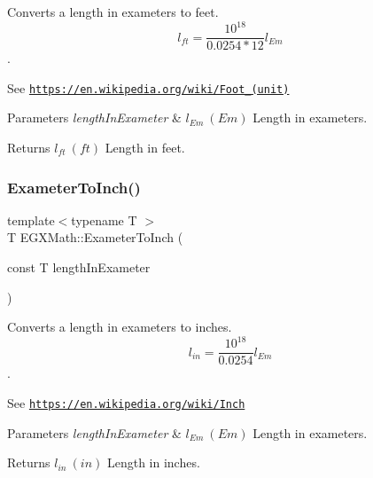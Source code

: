 Converts a length in exameters to feet. \[ l_{ft}= \frac{10^{18}}{0.0254 * 12} l_{Em} \]. 

See \href{https://en.wikipedia.org/wiki/Foot_(unit)}{\tt https\+://en.\+wikipedia.\+org/wiki/\+Foot\+\_\+(unit)} 
\begin{DoxyParams}{Parameters}
{\em length\+In\+Exameter} & $ l_{Em}\ (Em)$ Length in exameters. \\
\hline
\end{DoxyParams}
\begin{DoxyReturn}{Returns}
$ l_{ft}\ (ft)$ Length in feet. 
\end{DoxyReturn}
\mbox{\label{group___e_g_x_math-_conversions-_length_conversions-_s_i-_exameter-_imperial_gabf4408961480eb2b76d2f5c588df128e}} 
\subsubsection{\texorpdfstring{Exameter\+To\+Inch()}{ExameterToInch()}}
{\footnotesize\ttfamily template$<$typename T $>$ \\
T E\+G\+X\+Math\+::\+Exameter\+To\+Inch (\begin{DoxyParamCaption}\item[{const T}]{length\+In\+Exameter }\end{DoxyParamCaption})}



Converts a length in exameters to inches. \[ l_{in}= \frac{10^{18}}{0.0254} l_{Em} \]. 

See \href{https://en.wikipedia.org/wiki/Inch}{\tt https\+://en.\+wikipedia.\+org/wiki/\+Inch} 
\begin{DoxyParams}{Parameters}
{\em length\+In\+Exameter} & $ l_{Em}\ (Em)$ Length in exameters. \\
\hline
\end{DoxyParams}
\begin{DoxyReturn}{Returns}
$ l_{in}\ (in)$ Length in inches. 
\end{DoxyReturn}
\mbox{\label{group___e_g_x_math-_conversions-_length_conversions-_s_i-_exameter-_imperial_ga863f9f7f7e2826324fec642027c48614}} 
